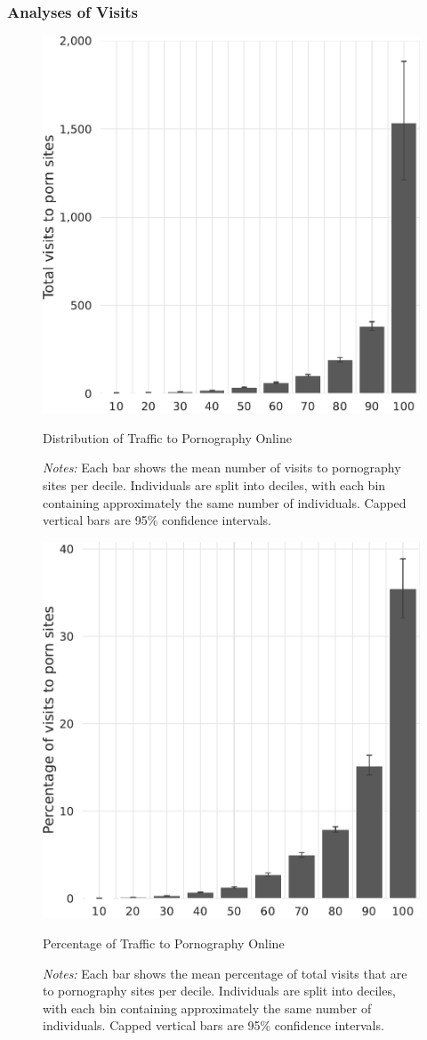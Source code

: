\documentclass[12pt,twoside]{article}
\begin{document}
\subsubsection{Analyses of Visits}
\label{si:visits}
\begin{figure}[ht]
	\centering
	\includegraphics[width=.5\linewidth]{figs/distribution_visits_to_adultsites.pdf}
	\caption{Distribution of Traffic to Pornography Online}
	\caption*{\footnotesize \emph{Notes:} 
            Each bar shows the mean number of visits to pornography sites per decile.
		Individuals are split into deciles, with each bin containing approximately the same number of individuals.
		Capped vertical bars are 95\% confidence intervals.
	}
	\label{fig:distribution_visits}
\end{figure}




\begin{figure}
	\centering
	\includegraphics[width=.5\linewidth]{figs/distribution_proportion_visits_to_adultsites.pdf}
	\caption{Percentage of Traffic to Pornography Online}
	\caption*{\footnotesize \emph{Notes:} 
             Each bar shows the mean percentage of total visits that are to pornography sites per decile.
		Individuals are split into deciles, with each bin containing approximately the same number of individuals.
		Capped vertical bars are 95\% confidence intervals.
	}
	\label{fig:distribution_prop_visits}
\end{figure}
\end{document}
